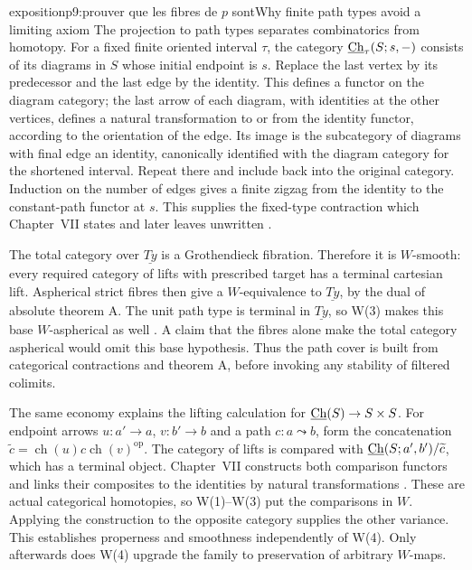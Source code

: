 \begin{dcomment}{exposition}{p9:prouver que les fibres de $p$ sont}{Why finite path types avoid a limiting axiom}
The projection to path types separates combinatorics from homotopy. For a fixed finite oriented interval \(\tau\), the category \(\underline{\mathrm{Ch}}_\tau(S;s,-)\) consists of its diagrams in \(S\) whose initial endpoint is \(s\). Replace the last vertex by its predecessor and the last edge by the identity. This defines a functor on the diagram category; the last arrow of each diagram, with identities at the other vertices, defines a natural transformation to or from the identity functor, according to the orientation of the edge. Its image is the subcategory of diagrams with final edge an identity, canonically identified with the diagram category for the shortened interval. Repeat there and include back into the original category. Induction on the number of edges gives a finite zigzag from the identity to the constant-path functor at \(s\). This supplies the fixed-type contraction which Chapter~VII states and later leaves unwritten \citep[manuscript pp.~152, 160, 170]{GrothendieckDerivateursVII}.

The total category over \(\underline{Ty}\) is a Grothendieck fibration. Therefore it is \(W\)-smooth: every required category of lifts with prescribed target has a terminal cartesian lift. Aspherical strict fibres then give a \(W\)-equivalence to \(\underline{Ty}\), by the dual of absolute theorem A. The unit path type is terminal in \(\underline{Ty}\), so W(3) makes this base \(W\)-aspherical as well \citep[manuscript pp.~160--161]{GrothendieckDerivateursVII}. A claim that the fibres alone make the total category aspherical would omit this base hypothesis. Thus the path cover is built from categorical contractions and theorem A, before invoking any stability of filtered colimits.

The same economy explains the lifting calculation for
\(\underline{\mathrm{Ch}}(S)\to S\times S\). For endpoint arrows \(u:a'\to a\), \(v:b'\to b\) and a path \(c:a\leadsto b\), form the concatenation \(\widetilde c=\operatorname{ch}(u)c\operatorname{ch}(v)^{\mathrm{op}}\). The category of lifts is compared with \(\underline{\mathrm{Ch}}(S;a',b')/\widetilde c\), which has a terminal object. Chapter~VII constructs both comparison functors and links their composites to the identities by natural transformations \citep[manuscript pp.~161--166]{GrothendieckDerivateursVII}. These are actual categorical homotopies, so W(1)--W(3) put the comparisons in \(W\). Applying the construction to the opposite category supplies the other variance. This establishes properness and smoothness independently of W(4). Only afterwards does W(4) upgrade the family to preservation of arbitrary \(W\)-maps.


\end{dcomment}
